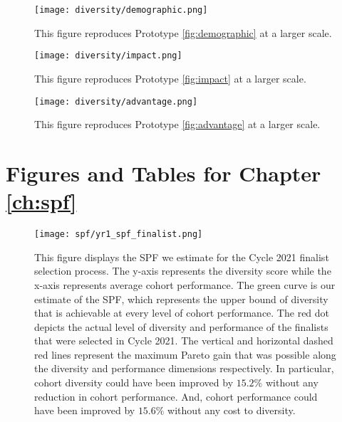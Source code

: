 \begin{figure}[!hbtp]
    \centering
    \texttt{[image: diversity/demographic.png]}
    \caption{This figure reproduces Prototype \ref{fig:demographic} at a larger scale.}
    \label{fig:demographic_full}
\end{figure}

\begin{figure}[!hbtp]
    \centering
    \texttt{[image: diversity/impact.png]}
    \caption{This figure reproduces Prototype \ref{fig:impact} at a larger scale.}
    \label{fig:impact_full}
\end{figure}

\begin{figure}[!hbtp]
    \centering
    \texttt{[image: diversity/advantage.png]}
    \caption{This figure reproduces Prototype \ref{fig:advantage} at a larger scale.}
    \label{fig:advantage_full}
\end{figure}

\newpage
\section{Figures and Tables for Chapter \ref{ch:spf}}\label{app:spffigures}
\begin{figure}[!hbtp]
    \centering
    \label{fig:spf_2021_full}
    \texttt{[image: spf/yr1\_spf\_finalist.png]} 
    \caption{This figure displays the SPF we estimate for the Cycle 2021 finalist selection process. The y-axis represents the diversity score while the x-axis represents average cohort performance. The green curve is our estimate of the SPF, which represents the upper bound of diversity that is achievable at every level of cohort performance. The red dot depicts the actual level of diversity and performance of the finalists that were selected in Cycle 2021. The vertical and horizontal dashed red lines represent the maximum Pareto gain that was possible along the diversity and performance dimensions respectively. In particular, cohort diversity could have been improved by $15.2\%$ without any reduction in cohort performance. And, cohort performance could have been improved by $15.6\%$ without any cost to diversity.}
\end{figure}
    
